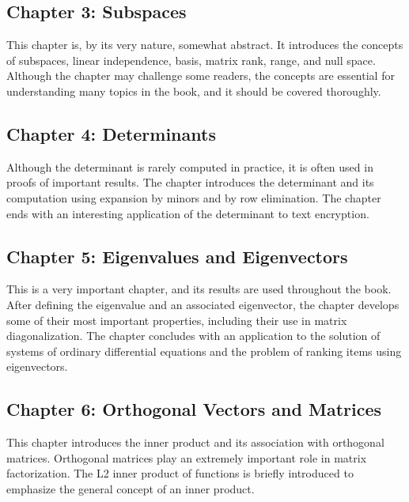 \documentclass[../main.tex]{subfiles}
\begin{document}
\subsection*{Chapter 3: Subspaces}
This chapter is, by its very nature, somewhat abstract. It introduces the concepts of subspaces, linear independence, basis, matrix rank, range, and null space. Although the chapter may challenge some readers, the concepts are essential for understanding many topics in the book, and it should be covered thoroughly.

\subsection*{Chapter 4: Determinants}
Although the determinant is rarely computed in practice, it is often used in proofs of important results. The chapter introduces the determinant and its computation using expansion by minors and by row elimination. The chapter ends with an interesting application of the determinant to text encryption.

\subsection*{Chapter 5: Eigenvalues and Eigenvectors}
This is a very important chapter, and its results are used throughout the book. After defining the eigenvalue and an associated eigenvector, the chapter develops some of their most important properties, including their use in matrix diagonalization. The chapter concludes with an application to the solution of systems of ordinary differential equations and the problem of ranking items using eigenvectors.

\subsection*{Chapter 6: Orthogonal Vectors and Matrices}
This chapter introduces the inner product and its association with orthogonal matrices. Orthogonal matrices play an extremely important role in matrix factorization. The L2 inner product of functions is briefly introduced to emphasize the general concept of an inner product.
\end{document}
